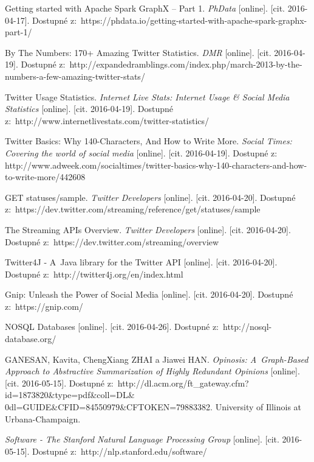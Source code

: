 \documentclass[thesis=B,czech]{FITthesis}[2012/06/26]
\begin{document}
\begin{thebibliography}{1}
Getting started with Apache Spark GraphX – Part 1. \textit{PhData} [online]. [cit. 2016-04-17]. Dostupné z:~https://phdata.io/getting-started-with-apache-spark-graphx-part-1/

By The Numbers: 170+ Amazing Twitter Statistics. \textit{DMR} [online]. [cit. 2016-04-19]. Dostupné z:~http://expandedramblings.com/index.php/march-2013-by-the-numbers-a-few-amazing-twitter-stats/

Twitter Usage Statistics. \textit{Internet Live Stats: Internet Usage \& Social Media Statistics} [online]. [cit. 2016-04-19]. Dostupné z:~http://www.internetlivestats.com/twitter-statistics/

Twitter Basics: Why 140-Characters, And How to Write More. \textit{Social Times: Covering the world of social media} [online]. [cit. 2016-04-19]. Dostupné z:~ http://www.adweek.com/socialtimes/twitter-basics-why-140-characters-and-how-to-write-more/442608

GET statuses/sample. \textit{Twitter Developers} [online]. [cit. 2016-04-20]. Dostupné z:~https://dev.twitter.com/streaming/reference/get/statuses/sample

The Streaming APIs Overview. \textit{Twitter Developers} [online]. [cit. 2016-04-20]. Dostupné z:~https://dev.twitter.com/streaming/overview

Twitter4J - A~Java library for the Twitter API [online]. [cit. 2016-04-20]. Dostupné z:~http://twitter4j.org/en/index.html

Gnip: Unleash the Power of Social Media [online]. [cit. 2016-04-20]. Dostupné z:~https://gnip.com/

NOSQL Databases [online]. [cit. 2016-04-26]. Dostupné z:~http://nosql-database.org/

GANESAN, Kavita, ChengXiang ZHAI a Jiawei HAN. \textit{Opinosis: A~Graph-Based Approach to Abstractive Summarization of Highly Redundant Opinions} [online]. [cit. 2016-05-15]. Dostupné z:~http://dl.acm.org/ft\_gateway.cfm?id=1873820\&type=pdf\&coll=DL\&\\0dl=GUIDE\&CFID=84550979\&CFTOKEN=79883382. University of Illinois at Urbana-Champaign.

\textit{Software - The Stanford Natural Language Processing Group} [online]. [cit. 2016-05-15]. Dostupné z:~http://nlp.stanford.edu/software/


\end{thebibliography}
\end{document}
